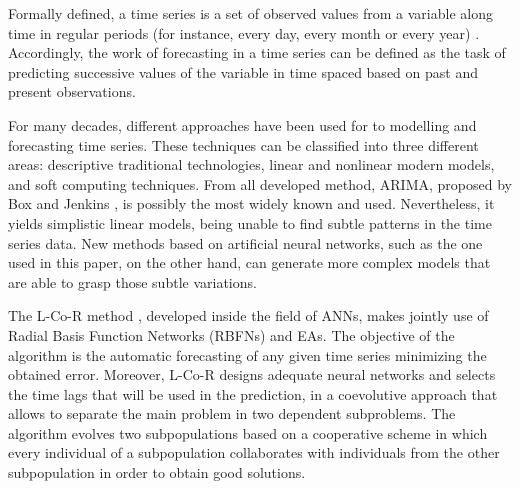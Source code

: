 \documentclass[a4paper,twoside]{article}
\newcommand{\metodo}{L-Co-R}
\begin{document}
Formally defined, a time series is a set of observed values from a
variable along time in regular periods (for instance, every day, every
month or every year) \cite{Pena2005}. Accordingly, the work of
forecasting in a time series can be defined as the task of predicting
successive values of the variable in time spaced based on past and
present observations. 

For many decades, different approaches have been used for to
modelling and forecasting time series. These techniques can be
classified into three different areas: descriptive traditional
technologies, linear and nonlinear modern models, and soft computing
techniques. From all developed method, ARIMA, proposed by Box and
Jenkins \cite{BoxJenk}, is possibly the most widely known and used. %
Nevertheless, it yields simplistic linear models, %
being unable to find subtle patterns in the time series data. %
New methods based on artificial neural networks, such as the one used
in this paper, on the other hand, can generate more complex
models that are able to grasp those subtle variations. 

The {\metodo} method \cite{Parras2012Softcomputing}, developed inside
the field of ANNs, makes jointly use of Radial Basis Function Networks
(RBFNs) and EAs. The objective of the algorithm is the automatic
forecasting of any given time series minimizing the obtained error. %
 Moreover, {\metodo} designs adequate neural networks and selects the
 time lags that will be used in the prediction, in a coevolutive
 \cite{Paredis95} %
 approach that allows to separate the main problem in two dependent
 subproblems. The algorithm evolves two subpopulations based on a
 cooperative scheme in which every individual of a subpopulation
 collaborates with individuals from the other subpopulation in order
 to obtain good solutions. 
\end{document}
